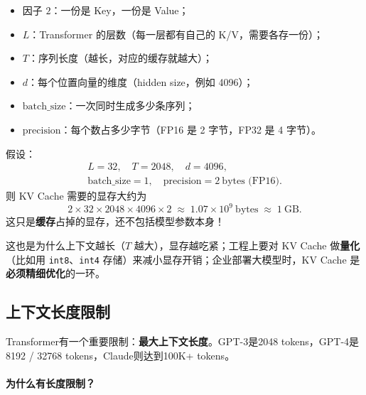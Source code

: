\begin{itemize}
    \item 因子 $2$：一份是 Key，一份是 Value；
    \item $L$：Transformer 的层数（每一层都有自己的 K/V，需要各存一份）；
    \item $T$：序列长度（越长，对应的缓存就越大）；
    \item $d$：每个位置向量的维度（hidden size，例如 4096）；
    \item $\text{batch\_size}$：一次同时生成多少条序列；
    \item $\text{precision}$：每个数占多少字节（FP16 是 2 字节，FP32 是 4 字节）。
\end{itemize}

\begin{example}[一个简单的数量级估算]
假设：
\begin{gather*}
L = 32,\quad
T = 2048,\quad
d = 4096,\\
\text{batch\_size}=1,\quad
\text{precision} = 2\ \text{bytes (FP16)}.
\end{gather*}
则 KV Cache 需要的显存大约为
\[
2 \times 32 \times 2048 \times 4096 \times 2
\;\approx\; 1.07\times 10^9\ \text{bytes} \;\approx\; 1\ \text{GB}.
\]
这只是\textbf{缓存}占掉的显存，还不包括模型参数本身！
\end{example}

这也是为什么上下文越长（$T$ 越大），显存越吃紧；工程上要对 KV Cache 做\textbf{量化}（比如用 \texttt{int8}、\texttt{int4} 存储）来减小显存开销；企业部署大模型时，KV Cache 是\textbf{必须精细优化}的一环。




\subsection{上下文长度限制}

Transformer有一个重要限制：\textbf{最大上下文长度}。GPT-3是2048 tokens，GPT-4是8192 / 32768 tokens，Claude则达到100K+ tokens。

\paragraph{为什么有长度限制？}

